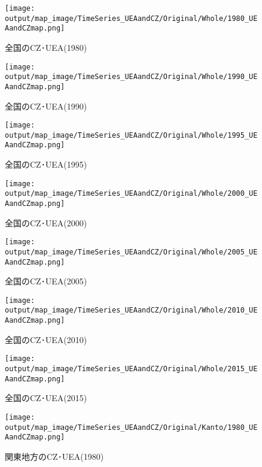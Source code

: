 \documentclass{ltjsarticle}
\begin{document}
  \begin{figure}[pbth]
    \centering
    \texttt{[image: output/map\_image/TimeSeries\_UEAandCZ/Original/Whole/1980\_UEAandCZmap.png]}
    \caption{\label{ori:tsA1980}全国のCZ･UEA(1980)}
  \end{figure}
  
  \begin{figure}[pbth]
    \centering
    \texttt{[image: output/map\_image/TimeSeries\_UEAandCZ/Original/Whole/1990\_UEAandCZmap.png]}
    \caption{\label{ori:tsA1990}全国のCZ･UEA(1990)}
  \end{figure}
  
  \begin{figure}[pbth]
    \centering
    \texttt{[image: output/map\_image/TimeSeries\_UEAandCZ/Original/Whole/1995\_UEAandCZmap.png]}
    \caption{\label{ori:tsA1995}全国のCZ･UEA(1995)}
  \end{figure}
  
  \begin{figure}[pbth]
    \centering
    \texttt{[image: output/map\_image/TimeSeries\_UEAandCZ/Original/Whole/2000\_UEAandCZmap.png]}
    \caption{\label{ori:tsA2000}全国のCZ･UEA(2000)}
  \end{figure}
  
  \begin{figure}[pbth]
    \centering
    \texttt{[image: output/map\_image/TimeSeries\_UEAandCZ/Original/Whole/2005\_UEAandCZmap.png]}
    \caption{\label{ori:tsA2005}全国のCZ･UEA(2005)}
  \end{figure}
  
  \begin{figure}[pbth]
    \centering
    \texttt{[image: output/map\_image/TimeSeries\_UEAandCZ/Original/Whole/2010\_UEAandCZmap.png]}
    \caption{\label{ori:tsA2010}全国のCZ･UEA(2010)}
  \end{figure}
  
  \begin{figure}[pbth]
    \centering
    \texttt{[image: output/map\_image/TimeSeries\_UEAandCZ/Original/Whole/2015\_UEAandCZmap.png]}
    \caption{\label{ori:tsA2015}全国のCZ･UEA(2015)}
  \end{figure}
  

\begin{figure}[pbth]
  \centering
  \texttt{[image: output/map\_image/TimeSeries\_UEAandCZ/Original/Kanto/1980\_UEAandCZmap.png]}
  \caption{\label{ori:tsK1980}関東地方のCZ･UEA(1980)}
\end{figure}
\end{document}
